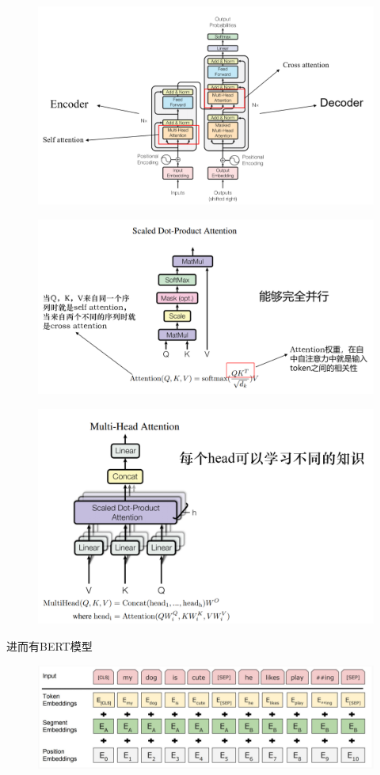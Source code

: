 \begin{figure}[H]
\centering
\includegraphics[width=0.8\linewidth]{fig/transformer.png}
\end{figure}
\begin{figure}[H]
\centering
\includegraphics[width=0.8\linewidth]{fig/attention.png}
\end{figure}
\begin{figure}[H]
\centering
\includegraphics[width=0.6\linewidth]{fig/multihead.png}
\end{figure}

进而有BERT模型
\begin{figure}[H]
\centering
\includegraphics[width=0.8\linewidth]{fig/bert.png}
\end{figure}

